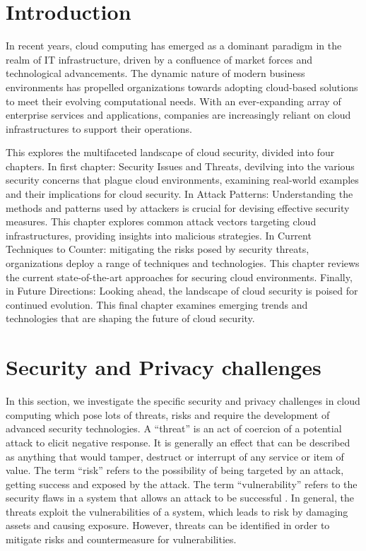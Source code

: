 \documentclass{ijitcs}
\author*{Mai Thanh Duy}{Department of Faculty of Applied Mathematics and Informatics, Hanoi University of Science and Technology, Hanoi, Vietnam}{duy.mt227225@sis.hust.edu.vn}{https://orcid.org/0000-xxxx-xxxx-xxxx}
\author{Tran Duc Toan}{Department of Faculty of Applied Mathematics and Informatics, Hanoi University of Science and Technology, Hanoi, Vietnam}{toan.td195929@sis.hust.edu.vn}{https://orcid.org/0000-xxxx-xxxx-xxxx}
\author{Vu Van Nghia}{Department of Faculty of Applied Mathematics and Informatics, Hanoi University of Science and Technology, Hanoi, Vietnam}{nghia.vv206205@sis.hust.edu.vn}{https://orcid.org/0000-xxxx-xxxx-xxxx}
\begin{document}
\maketitle


\section{Introduction}
 In recent years, cloud computing has emerged as a dominant paradigm in the realm of IT infrastructure, driven by a confluence of market forces and technological advancements. The dynamic nature of modern business environments has propelled organizations  towards adopting cloud-based solutions to meet their evolving computational needs. With an ever-expanding array of enterprise services and applications, companies are increasingly reliant on cloud infrastructures to support their operations.

 This explores the multifaceted landscape of cloud security, divided into four chapters. In first chapter: Security Issues and Threats,  devilving into the various security concerns that plague cloud environments, examining real-world examples and their implications for cloud security. In Attack Patterns: Understanding the methods and patterns used by attackers is crucial for devising effective security measures. This chapter explores common attack vectors targeting cloud infrastructures, providing insights into malicious strategies. In Current Techniques to Counter: mitigating the risks posed by security threats, organizations deploy a range of techniques and technologies. This chapter reviews the current state-of-the-art approaches for securing cloud environments. Finally, in Future Directions: Looking ahead, the landscape of cloud security is poised for continued evolution. This final chapter examines emerging trends and technologies that are shaping the future of cloud security.

\section{Security and Privacy challenges}
In this section, we investigate the specific security and privacy challenges in cloud computing which pose lots of threats, risks and require the development of advanced security technologies.
A “threat” is an act of coercion of a potential attack to elicit negative response. It is generally an effect that can be described as anything that would tamper, destruct or interrupt of any service or item of value. The term “risk” refers to the possibility of being targeted by an attack, getting success and exposed by the attack. The term “vulnerability” refers to the security flaws in a system that allows an attack to be successful . In general, the threats exploit the vulnerabilities of a system, which leads to risk by damaging assets and causing exposure. However, threats can be identified in order to mitigate risks and countermeasure for vulnerabilities.
\end{document}

